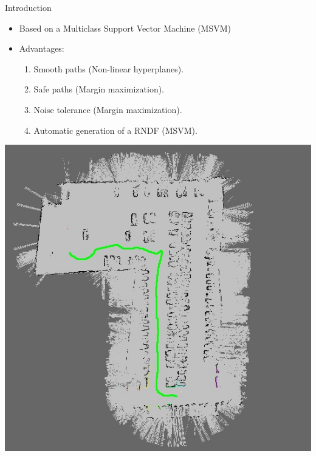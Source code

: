 \begin{frame}{Introduction}
  \begin{itemize}
   \item Based on a Multiclass Support Vector Machine (MSVM)
   \item Advantages:
   \begin{enumerate}
    \item Smooth paths (Non-linear hyperplanes).
    \item Safe paths (Margin maximization).
    \item Noise tolerance (Margin maximization).
    \item Automatic generation of a RNDF (MSVM).
   \end{enumerate}
  \end{itemize}
  \begin{center}
    \includegraphics[height=0.4\textheight]{figure7}
  \end{center}
  

\end{frame}
